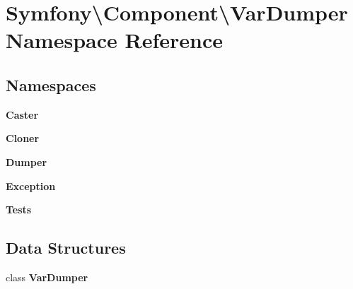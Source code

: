 \section{Symfony\textbackslash{}Component\textbackslash{}Var\+Dumper Namespace Reference}
\label{namespace_symfony_1_1_component_1_1_var_dumper}
\subsection*{Namespaces}
\begin{DoxyCompactItemize}
\item 
 {\bf Caster}
\item 
 {\bf Cloner}
\item 
 {\bf Dumper}
\item 
 {\bf Exception}
\item 
 {\bf Tests}
\end{DoxyCompactItemize}
\subsection*{Data Structures}
\begin{DoxyCompactItemize}
\item 
class {\bf Var\+Dumper}
\end{DoxyCompactItemize}
